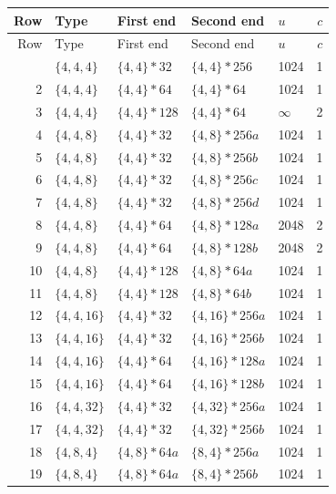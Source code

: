 \small
\begin{longtable}{rllllr}
\toprule
Row & Type & First end & Second end & $u$ & $c$\\
\midrule\endfirsthead
\toprule Row & Type & First end & Second end & $u$ & $c$\\\midrule\endhead
\bottomrule\endfoot
1 & \(\{4,4,4\}\) & \(\{4,4\}\!\ast 32\) & \(\{4,4\}\!\ast 256\) & 1024 & 1 \\
2 & \(\{4,4,4\}\) & \(\{4,4\}\!\ast 64\) & \(\{4,4\}\!\ast 64\) & 1024 & 1 \\
3 & \(\{4,4,4\}\) & \(\{4,4\}\!\ast 128\) & \(\{4,4\}\!\ast 64\) & \(\infty\) & 2 \\
4 & \(\{4,4,8\}\) & \(\{4,4\}\!\ast 32\) & \(\{4,8\}\!\ast 256a\) & 1024 & 1 \\
5 & \(\{4,4,8\}\) & \(\{4,4\}\!\ast 32\) & \(\{4,8\}\!\ast 256b\) & 1024 & 1 \\
6 & \(\{4,4,8\}\) & \(\{4,4\}\!\ast 32\) & \(\{4,8\}\!\ast 256c\) & 1024 & 1 \\
7 & \(\{4,4,8\}\) & \(\{4,4\}\!\ast 32\) & \(\{4,8\}\!\ast 256d\) & 1024 & 1 \\
8 & \(\{4,4,8\}\) & \(\{4,4\}\!\ast 64\) & \(\{4,8\}\!\ast 128a\) & 2048 & 2 \\
9 & \(\{4,4,8\}\) & \(\{4,4\}\!\ast 64\) & \(\{4,8\}\!\ast 128b\) & 2048 & 2 \\
10 & \(\{4,4,8\}\) & \(\{4,4\}\!\ast 128\) & \(\{4,8\}\!\ast 64a\) & 1024 & 1 \\
11 & \(\{4,4,8\}\) & \(\{4,4\}\!\ast 128\) & \(\{4,8\}\!\ast 64b\) & 1024 & 1 \\
12 & \(\{4,4,16\}\) & \(\{4,4\}\!\ast 32\) & \(\{4,16\}\!\ast 256a\) & 1024 & 1 \\
13 & \(\{4,4,16\}\) & \(\{4,4\}\!\ast 32\) & \(\{4,16\}\!\ast 256b\) & 1024 & 1 \\
14 & \(\{4,4,16\}\) & \(\{4,4\}\!\ast 64\) & \(\{4,16\}\!\ast 128a\) & 1024 & 1 \\
15 & \(\{4,4,16\}\) & \(\{4,4\}\!\ast 64\) & \(\{4,16\}\!\ast 128b\) & 1024 & 1 \\
16 & \(\{4,4,32\}\) & \(\{4,4\}\!\ast 32\) & \(\{4,32\}\!\ast 256a\) & 1024 & 1 \\
17 & \(\{4,4,32\}\) & \(\{4,4\}\!\ast 32\) & \(\{4,32\}\!\ast 256b\) & 1024 & 1 \\
18 & \(\{4,8,4\}\) & \(\{4,8\}\!\ast 64a\) & \(\{8,4\}\!\ast 256a\) & 1024 & 1 \\
19 & \(\{4,8,4\}\) & \(\{4,8\}\!\ast 64a\) & \(\{8,4\}\!\ast 256b\) & 1024 & 1 \\

\end{longtable}
